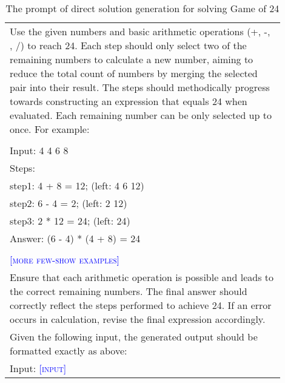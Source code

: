\begin{table*}[ht]
\small
\centering
\caption{The prompt of direct solution generation for solving Game of 24}
\begin{tabular}{p{0.9\linewidth}} \toprule
Use the given numbers and basic arithmetic operations (+, -, , /) to reach 24. Each step should only select two of the remaining numbers to calculate a new number, aiming to reduce the total count of numbers by merging the selected pair into their result. The steps should methodically progress towards constructing an expression that equals 24 when evaluated. Each remaining number can be only selected up to once. For example:\\
\\
Input: 4 4 6 8\\
Steps:\\
step1: 4 + 8 = 12; (left: 4 6 12)\\
step2: 6 - 4 = 2; (left: 2 12)\\
step3: 2 * 12 = 24; (left: 24)\\
Answer: (6 - 4) * (4 + 8) = 24\\
\\
\textcolor{blue}{\textsc{[more few-show examples]}}\\
Ensure that each arithmetic operation is possible and leads to the correct remaining numbers. The final answer should correctly reflect the steps performed to achieve 24. If an error occurs in calculation, revise the final expression accordingly. \\
Given the following input, the generated output should be formatted exactly as above: \\
Input: \textcolor{blue}{\textsc{[input]}}
\\ \bottomrule
\end{tabular}
\label{tab:direct_solution_generation_game24}
\end{table*}

